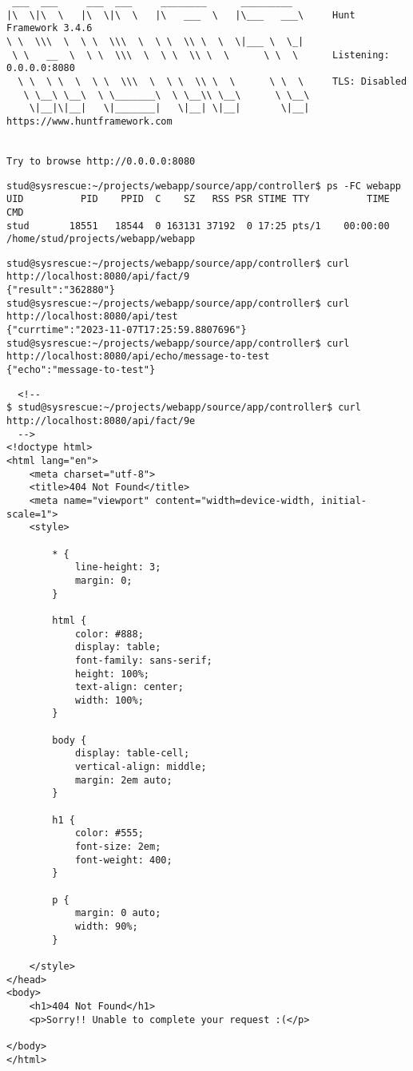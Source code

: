 \documentclass{studrep}
\begin{document}
\begin{verbatim}
 ___  ___     ___  ___     ________      _________
|\  \|\  \   |\  \|\  \   |\   ___  \   |\___   ___\     Hunt Framework 3.4.6
\ \  \\\  \  \ \  \\\  \  \ \  \\ \  \  \|___ \  \_|
 \ \   __  \  \ \  \\\  \  \ \  \\ \  \      \ \  \      Listening: 0.0.0.0:8080
  \ \  \ \  \  \ \  \\\  \  \ \  \\ \  \      \ \  \     TLS: Disabled
   \ \__\ \__\  \ \_______\  \ \__\\ \__\      \ \__\
    \|__|\|__|   \|_______|   \|__| \|__|       \|__|    https://www.huntframework.com


Try to browse http://0.0.0.0:8080
\end{verbatim}


\begin{verbatim}
stud@sysrescue:~/projects/webapp/source/app/controller$ ps -FC webapp
UID          PID    PPID  C    SZ   RSS PSR STIME TTY          TIME CMD
stud       18551   18544  0 163131 37192  0 17:25 pts/1    00:00:00 /home/stud/projects/webapp/webapp
\end{verbatim}

\begin{verbatim}
stud@sysrescue:~/projects/webapp/source/app/controller$ curl http://localhost:8080/api/fact/9
{"result":"362880"}
stud@sysrescue:~/projects/webapp/source/app/controller$ curl http://localhost:8080/api/test
{"currtime":"2023-11-07T17:25:59.8807696"}
stud@sysrescue:~/projects/webapp/source/app/controller$ curl http://localhost:8080/api/echo/message-to-test
{"echo":"message-to-test"}
\end{verbatim}

\begin{verbatim}
  <!--
$ stud@sysrescue:~/projects/webapp/source/app/controller$ curl http://localhost:8080/api/fact/9e
  -->
<!doctype html>
<html lang="en">
    <meta charset="utf-8">
    <title>404 Not Found</title>
    <meta name="viewport" content="width=device-width, initial-scale=1">
    <style>

        * {
            line-height: 3;
            margin: 0;
        }

        html {
            color: #888;
            display: table;
            font-family: sans-serif;
            height: 100%;
            text-align: center;
            width: 100%;
        }

        body {
            display: table-cell;
            vertical-align: middle;
            margin: 2em auto;
        }

        h1 {
            color: #555;
            font-size: 2em;
            font-weight: 400;
        }

        p {
            margin: 0 auto;
            width: 90%;
        }

    </style>
</head>
<body>
    <h1>404 Not Found</h1>
    <p>Sorry!! Unable to complete your request :(</p>

</body>
</html>
\end{verbatim}
\end{document}
